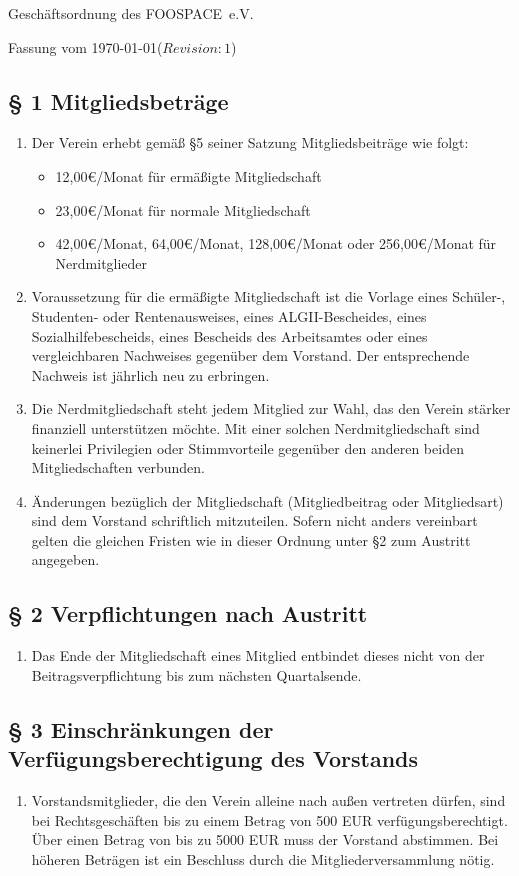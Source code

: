 \documentclass[10pt,a4paper]{article}
\newcommand{\name}{FOOSPACE}
\newcommand{\revision}{$Revision: 1$}
\begin{document}
{\LARGE Geschäftsordnung des \name\ e.V.}

Fassung vom \today (\revision)

\subsection*{§ 1 Mitgliedsbeträge}
\begin{enumerate}
\item Der Verein erhebt gemäß §5 seiner Satzung Mitgliedsbeiträge wie folgt:
	\begin{itemize}
	\item 12,00€/Monat für ermäßigte Mitgliedschaft
	\item 23,00€/Monat für normale Mitgliedschaft
	\item 42,00€/Monat, 64,00€/Monat, 128,00€/Monat oder 256,00€/Monat für Nerdmitglieder
	\end{itemize}
\item Voraussetzung für die ermäßigte Mitgliedschaft ist die Vorlage eines
	Schüler-, Studenten- oder Rentenausweises, eines ALGII-Bescheides,
	eines Sozialhilfebescheids, eines Bescheids des Arbeitsamtes
	oder eines vergleichbaren Nachweises gegenüber dem Vorstand.
	Der entsprechende Nachweis ist jährlich neu zu erbringen.
\item Die Nerdmitgliedschaft steht jedem Mitglied zur Wahl, das den Verein stärker
	finanziell unterstützen möchte. Mit einer solchen
	Nerdmitgliedschaft sind keinerlei Privilegien oder Stimmvorteile gegenüber
	den anderen beiden Mitgliedschaften verbunden.
\item Änderungen bezüglich der Mitgliedschaft (Mitgliedbeitrag oder Mitgliedsart)
	sind dem Vorstand schriftlich mitzuteilen. Sofern nicht anders
	vereinbart gelten die gleichen Fristen wie in dieser Ordnung unter §2
	zum Austritt angegeben.
\end{enumerate}

\subsection*{§ 2 Verpflichtungen nach Austritt}
\begin{enumerate}
\item Das Ende der Mitgliedschaft eines Mitglied entbindet dieses nicht von der
	Beitragsverpflichtung bis zum nächsten Quartalsende.
\end{enumerate}

\subsection*{§ 3 Einschränkungen der Verfügungsberechtigung des Vorstands}
\begin{enumerate}
\item Vorstandsmitglieder, die den Verein alleine nach außen vertreten
    dürfen, sind bei Rechtsgeschäften bis zu einem Betrag von 500 EUR
    verfügungsberechtigt. Über einen Betrag von bis zu 5000 EUR muss der
    Vorstand abstimmen. Bei höheren Beträgen ist ein Beschluss durch die
    Mitgliederversammlung nötig.
\end{enumerate}
\end{document}

